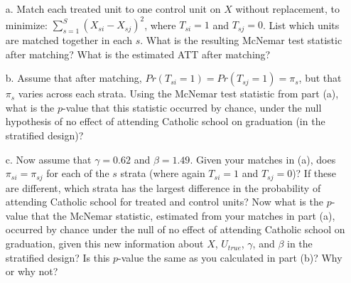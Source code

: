\documentclass{article}
\begin{document}
\begin{itemize}

\item[a.] Match each treated unit to one control unit on $X$ without
  replacement,
  to minimize: $\sum_{s=1}^{S}(X_{si}-X_{sj})^2$, where $T_{si}=1$ and
  $T_{sj}=0$. List which units are matched together in each $s$.  What
  is the resulting McNemar test statistic after matching?  What is the
  estimated ATT after matching?

\item[b.] Assume that after matching,
  $Pr(T_{si}=1)=Pr(T_{sj}=1)=\pi_{s}$, but that $\pi_s$ varies across
  each strata.  Using the McNemar test statistic from part (a),
  what is the $p$-value that this statistic occurred by chance, under
  the null hypothesis of no effect of attending Catholic school on
  graduation (in the stratified design)?

\item[c.] Now assume that $\gamma=0.62$ and $\beta=1.49$.
  Given your matches in (a), does $\pi_{si}=\pi_{sj}$ for each of the
  $s$ strata (where again $T_{si}=1$ and $T_{sj}=0$)?  If these are
  different, which strata has the largest difference in the
  probability of attending Catholic school for treated and control
  units?  Now what is the $p$-value that the McNemar statistic,
  estimated from your matches in part (a), occurred by chance under
  the null of no effect of attending Catholic school on graduation,
  given this new information about $X$, $U_{true}$, $\gamma$, and
  $\beta$ in the stratified design?  Is this $p$-value the same as you
  calculated in part (b)? Why or why not?

\end{itemize}

\end{document}
